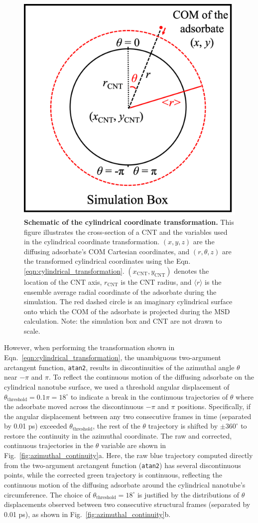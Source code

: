 \documentclass[journal=jpcbfk, layout=twocolumn, manuscript=article]{achemso}
\begin{document}
\begin{figure}[!h]
    \centering
    \includegraphics[width=.4\textwidth]{Appendices/MSD_concepts}
    \caption[Schematic of the cylindrical coordinate transformation.]{\textbf{Schematic of the cylindrical coordinate transformation.} This figure illustrates the cross-section of a CNT and the variables used in the cylindrical coordinate transformation. $(x,y,z)$ are the diffusing adsorbate's COM Cartesian coordinates, and $(r,\theta,z)$ are the transformed cylindrical coordinates using the Eqn. \ref{eqn:cylindrical_transformation}. $(x_\mathrm{CNT},y_\mathrm{CNT})$ denotes the location of the CNT axis, $r_\mathrm{CNT}$ is the CNT radius, and $\langle r\rangle$ is the ensemble average radial coordinate of the adsorbate during the simulation. The red dashed circle is an imaginary cylindrical surface onto which the COM of the adsorbate is projected during the MSD calculation. Note: the simulation box and CNT are not drawn to scale. 
    }
    \label{fig:cylindrical_transformation}
\end{figure}

However, when performing the transformation shown in Eqn.~\ref{eqn:cylindrical_transformation}, the unambiguous two-argument arctangent function, \texttt{atan2}, results in discontinuities of the azimuthal angle $\theta$ near $-\pi$ and $\pi$. To reflect the continuous motion of the diffusing adsorbate on the cylindrical nanotube surface, we used a threshold angular displacement of $\theta_{\textrm{threshold}}=0.1\pi=18^{\circ}$ to indicate a break in the continuous trajectories of $\theta$ where the adsorbate moved across the discontinuous $-\pi$ and $\pi$ positions. Specifically, if the angular displacement between any two consecutive frames in time (separated by 0.01 ps) exceeded $\theta_{\textrm{threshold}}$, the rest of the $\theta$ trajectory is shifted by $\pm 360^{\circ}$ to restore the continuity in the azimuthal coordinate. The raw and corrected, continuous trajectories in the $\theta$ variable are shown in Fig.~\ref{fig:azimuthal_continuity}a. Here, the raw blue trajectory computed directly from the two-argument arctangent function (\texttt{atan2}) has several discontinuous points, while the corrected green trajectory is continuous, reflecting the continuous motion of the diffusing adsorbate around the cylindrical nanotube's circumference. The choice of $\theta_{\textrm{threshold}}=18^{\circ}$ is justified by the distributions of $\theta$ displacements observed between two consecutive structural frames (separated by 0.01 ps), as shown in Fig.~\ref{fig:azimuthal_continuity}b.
\end{document}
